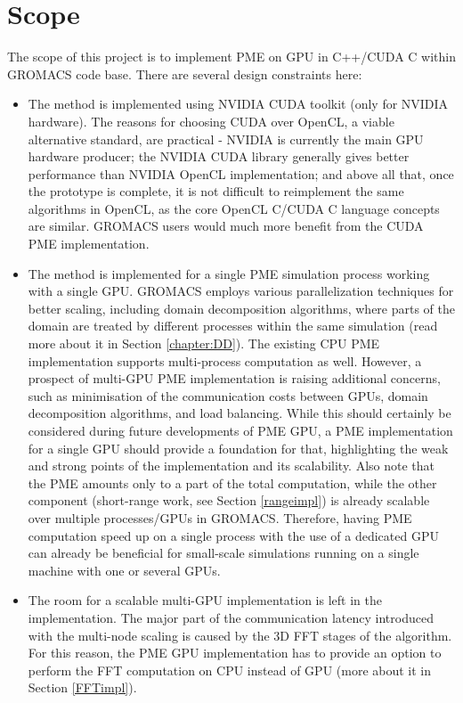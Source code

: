 \documentclass[12pt,a4paper,notitlepage]{report}
\begin{document}
\section{Scope} \label{chapter_scope}

The scope of this project is to implement PME on GPU in C++/CUDA C within GROMACS code base.
There are several design constraints here:
\begin{itemize}
\item The method is implemented using NVIDIA CUDA toolkit (only for NVIDIA hardware). The reasons for choosing CUDA over OpenCL, a viable alternative standard, are practical - NVIDIA is currently the main GPU hardware producer; the NVIDIA CUDA library generally gives better performance than NVIDIA OpenCL implementation; and above all that, once the prototype is complete, it is not difficult to reimplement the same algorithms in OpenCL, as the core OpenCL C/CUDA C language concepts are similar. GROMACS users would much more benefit from the CUDA PME implementation.
\item The method is implemented for a single PME simulation process working with a single GPU. GROMACS employs various parallelization techniques for better scaling, including domain decomposition algorithms, where parts of the domain are treated by different processes within the same simulation (read more about it in Section \ref{chapter:DD}). The existing CPU PME implementation supports multi-process computation as well. 
However, a prospect of multi-GPU PME implementation is raising additional concerns, such as minimisation of the communication costs between GPUs, domain decomposition algorithms, and load balancing. While this should certainly be considered during future developments of PME GPU, a PME implementation for a single GPU should provide a foundation for that, highlighting the weak and strong points of the implementation and its scalability. 
Also note that the PME amounts only to a part of the total computation, while the other component (short-range work, see Section \ref{rangeimpl}) is already scalable over multiple processes/GPUs in GROMACS. Therefore, having PME computation speed up on a single process with the use of a dedicated GPU can already be beneficial for small-scale simulations running on a single machine with one or several GPUs.
\item The room for a scalable multi-GPU implementation is left in the implementation. The major part of the communication latency introduced with the multi-node scaling is caused by the 3D FFT stages of the algorithm. For this reason, the PME GPU implementation has to provide an option to perform the FFT computation on CPU instead of GPU (more about it in Section \ref{FFTimpl}).

\end{itemize}
\iffalse
\end{document}
